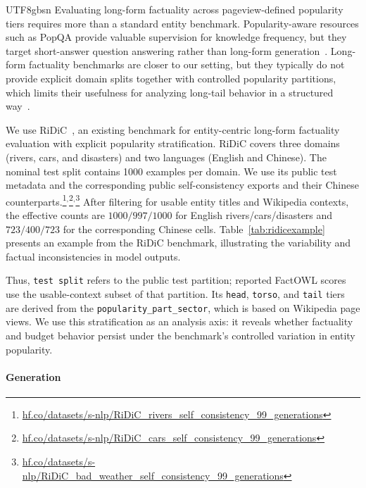 \documentclass[11pt]{article}
\begin{document}
\begin{CJK*}{UTF8}{gbsn}
Evaluating long-form factuality across pageview-defined popularity tiers requires more than a standard entity benchmark. Popularity-aware resources such as PopQA provide valuable supervision for knowledge frequency, but they target short-answer question answering rather than long-form generation~\citep{popqa}. Long-form factuality benchmarks are closer to our setting, but they typically do not provide explicit domain splits together with controlled popularity partitions, which limits their usefulness for analyzing long-tail behavior in a structured way~\citep{wildhallucinations}.

We use RiDiC~\citep{braslavski2026chroniclesridicgeneratingdatasets}, an existing benchmark for entity-centric long-form factuality evaluation with explicit popularity stratification. RiDiC covers three domains (rivers, cars, and disasters) and two languages (English and Chinese). The nominal test split contains 1000 examples per domain. We use its public test metadata and the corresponding public self-consistency exports and their Chinese counterparts.\footnote{\url{hf.co/datasets/s-nlp/RiDiC_rivers_self_consistency_99_generations}}$^,$\footnote{
\url{hf.co/datasets/s-nlp/RiDiC\_cars\_self\_consistency\_99\_generations}}$^,$\footnote{\url{hf.co/datasets/s-nlp/RiDiC\_bad\_weather\_self\_consistency\_99\_generations}}
After filtering for usable entity titles and Wikipedia contexts, the effective counts are $1000/997/1000$ for English rivers/cars/disasters and $723/400/723$ for the corresponding Chinese cells. Table~\ref{tab:ridicexample} presents an example from the RiDiC benchmark, illustrating the variability and factual inconsistencies in model outputs.

Thus, \texttt{test}~\texttt{split} refers to the public test partition; reported FactOWL scores use the usable-context subset of that partition. Its \texttt{head}, \texttt{torso}, and \texttt{tail} tiers are derived from the \texttt{popularity\_part\_sector}, which is based on Wikipedia page views. We use this stratification as an analysis axis: it reveals whether factuality and budget behavior persist under the benchmark's controlled variation in entity popularity.

\paragraph{Generation}


\end{CJK*}
\end{document}

